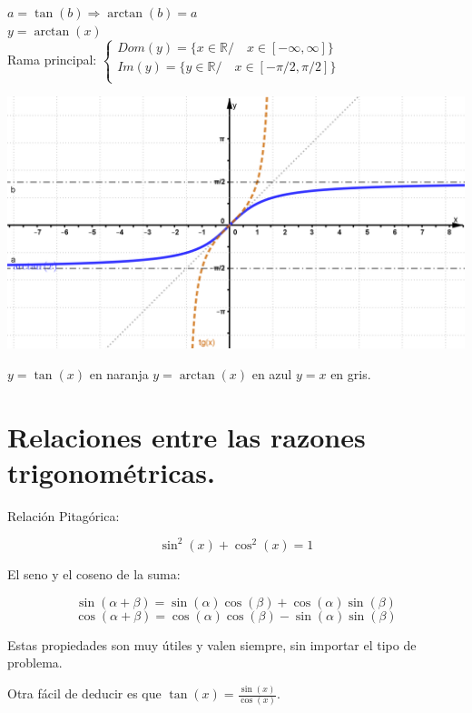 \documentclass[a4paper,11pt,spanish,sans]{exam}
\begin{document}
\begin{minipage}{0.5\textwidth}
	\centering
	$a=\tan(b) \Rightarrow \arctan(b)=a $ \\
	$y=\arctan(x)$\\
	Rama principal:
	$\begin{cases}
	Dom(y)=\lbrace x \in \mathbb{R} / \quad x \in [-\infty,\infty] \rbrace \\
	Im(y)=\lbrace y \in \mathbb{R} / \quad x \in [-\pi/2,\pi/2] \rbrace \\
	\end{cases}
	$
\end{minipage}
\begin{minipage}{0.5\textwidth}
	\includegraphics[width=\linewidth]{arctan.png}
	\begin{center}
		$y=\tan (x) $ en naranja $y=\arctan(x)$ en azul $y=x$ en gris.
	\end{center}
\end{minipage}

\section*{Relaciones entre las razones trigonométricas.}

Relación Pitagórica:

\[
\sin^2(x)+\cos^2(x)=1
\]

El seno y el coseno de la suma:

\[
\sin(\alpha+\beta)=\sin(\alpha)\cos(\beta) + \cos(\alpha)\sin(\beta)
\]
\[
\cos(\alpha+\beta)=\cos(\alpha)\cos(\beta) - \sin(\alpha)\sin(\beta)
\]

Estas propiedades son muy útiles y  valen siempre, sin importar el tipo de  problema.

Otra fácil de deducir es que $\tan(x)=\frac{\sin (x)}{\cos (x)}$.
\end{document}
